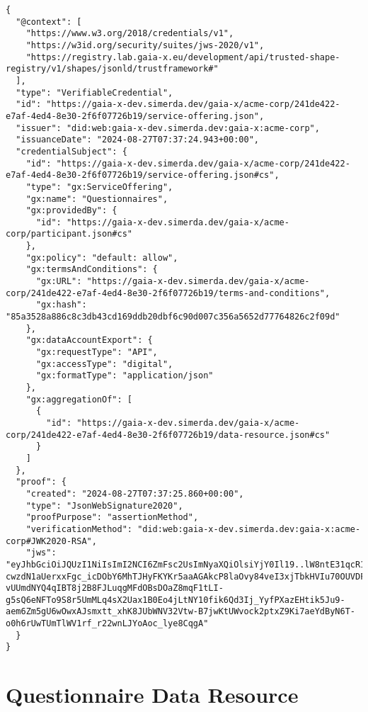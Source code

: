 \begin{verbatim}
{
  "@context": [
    "https://www.w3.org/2018/credentials/v1",
    "https://w3id.org/security/suites/jws-2020/v1",
    "https://registry.lab.gaia-x.eu/development/api/trusted-shape-registry/v1/shapes/jsonld/trustframework#"
  ],
  "type": "VerifiableCredential",
  "id": "https://gaia-x-dev.simerda.dev/gaia-x/acme-corp/241de422-e7af-4ed4-8e30-2f6f07726b19/service-offering.json",
  "issuer": "did:web:gaia-x-dev.simerda.dev:gaia-x:acme-corp",
  "issuanceDate": "2024-08-27T07:37:24.943+00:00",
  "credentialSubject": {
    "id": "https://gaia-x-dev.simerda.dev/gaia-x/acme-corp/241de422-e7af-4ed4-8e30-2f6f07726b19/service-offering.json#cs",
    "type": "gx:ServiceOffering",
    "gx:name": "Questionnaires",
    "gx:providedBy": {
      "id": "https://gaia-x-dev.simerda.dev/gaia-x/acme-corp/participant.json#cs"
    },
    "gx:policy": "default: allow",
    "gx:termsAndConditions": {
      "gx:URL": "https://gaia-x-dev.simerda.dev/gaia-x/acme-corp/241de422-e7af-4ed4-8e30-2f6f07726b19/terms-and-conditions",
      "gx:hash": "85a3528a886c8c3db43cd169ddb20dbf6c90d007c356a5652d77764826c2f09d"
    },
    "gx:dataAccountExport": {
      "gx:requestType": "API",
      "gx:accessType": "digital",
      "gx:formatType": "application/json"
    },
    "gx:aggregationOf": [
      {
        "id": "https://gaia-x-dev.simerda.dev/gaia-x/acme-corp/241de422-e7af-4ed4-8e30-2f6f07726b19/data-resource.json#cs"
      }
    ]
  },
  "proof": {
    "created": "2024-08-27T07:37:25.860+00:00",
    "type": "JsonWebSignature2020",
    "proofPurpose": "assertionMethod",
    "verificationMethod": "did:web:gaia-x-dev.simerda.dev:gaia-x:acme-corp#JWK2020-RSA",
    "jws": "eyJhbGciOiJQUzI1NiIsImI2NCI6ZmFsc2UsImNyaXQiOlsiYjY0Il19..lW8ntE31qcR1aoZQpLnVdQpLJJ5u-cwzdN1aUerxxFgc_icDObY6MhTJHyFKYKr5aaAGAkcP8laOvy84veI3xjTbkHVIu70OUVDFmhUbNZZd8sLow0phODenYDp-vUUmdNYQ4qIBT8j2B8FJLuqgMFdOBsDOaZ8mqF1tLI-g5sQ6eNFTo9S8r5UmMLq4sX2Uax1B0Eo4jLtNY10fik6Qd3Ij_YyfPXazEHtik5Ju9-aem6Zm5gU6wOwxAJsmxtt_xhK8JUbWNV32Vtw-B7jwKtUWvock2ptxZ9Ki7aeYdByN6T-o0h6rUwTUmTlWV1rf_r22wnLJYoAoc_lye8CqgA"
  }
}
\end{verbatim}

\section{Questionnaire Data Resource}

